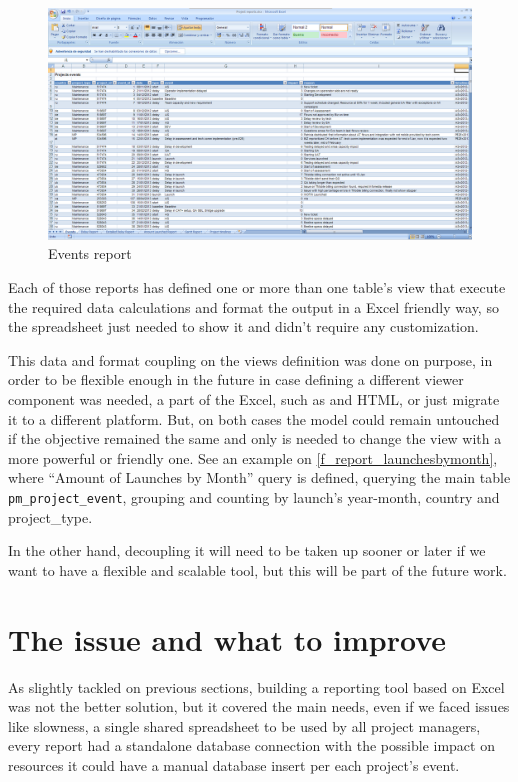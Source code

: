 \begin{figure}[ht!]
	\centering
   	\includegraphics[width=1\textwidth]{./resources/report_events.png}
   	\caption{Events report}
   	\label{f_report_events}
\end{figure}

Each of those reports has defined one or more than one table's view that execute
the required data calculations and format the output in a Excel friendly way, so
the spreadsheet just needed to show it and didn't require any customization. 

This data and format coupling on the views definition was done on purpose,
in order to be flexible enough in the future in case defining a different viewer
component was needed, a part of the Excel, such as and HTML, or just migrate it
to a different platform. But, on both cases the model could remain untouched if
the objective remained the same and only is needed to change the  view with a
more powerful or friendly one. See an example on
\ref{f_report_launchesbymonth}, where ``Amount of Launches by Month'' query 
is defined, querying the main table \texttt{pm\_project\_event}, grouping and
counting by launch's year-month, country and project_type.



In the other hand, decoupling it will need to be taken up sooner or later if
we want to have a flexible and scalable tool, but this will be part of the
future work.

\section{The issue and what to improve}
As slightly tackled on previous sections, building a reporting tool based on
Excel was not the better solution, but it covered the main needs, even if we
faced issues like slowness, a single shared spreadsheet to be used by all
project managers, every report had a standalone database connection with the
possible impact on resources it could have a manual database insert per
each project's event.

